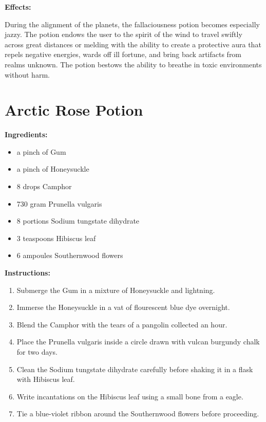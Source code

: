 \documentclass{article}
\begin{document}
\textbf{Effects:}

During the alignment of the planets, the fallaciousness potion becomes especially jazzy. The potion endows the user to the spirit of the wind to travel swiftly across great distances or melding with the ability to create a protective aura that repels negative energies, wards off ill fortune, and bring back artifacts from realms unknown. The potion bestows the ability to breathe in toxic environments without harm.

\newpage
\section*{Arctic Rose Potion}

\textbf{Ingredients:}

\begin{itemize}
  \item a pinch of Gum
  \item a pinch of Honeysuckle
  \item 8 drops Camphor
  \item 730 gram Prunella vulgaris
  \item 8 portions Sodium tungstate dihydrate
  \item 3 teaspoons Hibiscus leaf
  \item 6 ampoules Southernwood flowers
\end{itemize}

\textbf{Instructions:}

\begin{enumerate}
  \item Submerge the Gum in a mixture of Honeysuckle and lightning.
  \item Immerse the Honeysuckle in a vat of flourescent blue dye overnight.
  \item Blend the Camphor with the tears of a pangolin collected an hour.
  \item Place the Prunella vulgaris inside a circle drawn with vulcan burgundy chalk for two days.
  \item Clean the Sodium tungstate dihydrate carefully before shaking it in a flask with Hibiscus leaf.
  \item Write incantations on the Hibiscus leaf using a small bone from a eagle.
  \item Tie a blue-violet ribbon around the Southernwood flowers before proceeding.
\end{enumerate}
\end{document}
